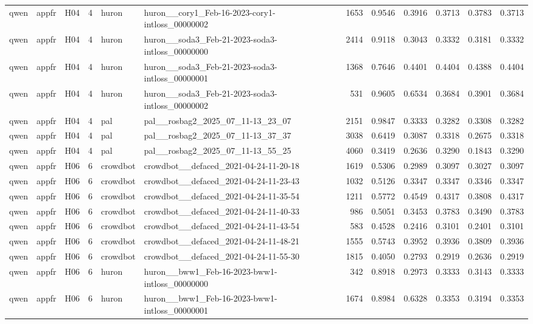 \begin{table}[tbp]
\begin{tabular}{lllrllrrrrrr}
qwen & appfr & H04 & 4 & huron & huron\_\_cory1\_Feb-16-2023-cory1-intloss\_00000002 & 1653 & 0.9546 & 0.3916 & 0.3713 & 0.3783 & 0.3713 \\
qwen & appfr & H04 & 4 & huron & huron\_\_soda3\_Feb-21-2023-soda3-intloss\_00000000 & 2414 & 0.9118 & 0.3043 & 0.3332 & 0.3181 & 0.3332 \\
qwen & appfr & H04 & 4 & huron & huron\_\_soda3\_Feb-21-2023-soda3-intloss\_00000001 & 1368 & 0.7646 & 0.4401 & 0.4404 & 0.4388 & 0.4404 \\
qwen & appfr & H04 & 4 & huron & huron\_\_soda3\_Feb-21-2023-soda3-intloss\_00000002 & 531 & 0.9605 & 0.6534 & 0.3684 & 0.3901 & 0.3684 \\
qwen & appfr & H04 & 4 & pal & pal\_\_rosbag2\_2025\_07\_11-13\_23\_07 & 2151 & 0.9847 & 0.3333 & 0.3282 & 0.3308 & 0.3282 \\
qwen & appfr & H04 & 4 & pal & pal\_\_rosbag2\_2025\_07\_11-13\_37\_37 & 3038 & 0.6419 & 0.3087 & 0.3318 & 0.2675 & 0.3318 \\
qwen & appfr & H04 & 4 & pal & pal\_\_rosbag2\_2025\_07\_11-13\_55\_25 & 4060 & 0.3419 & 0.2636 & 0.3290 & 0.1843 & 0.3290 \\
qwen & appfr & H06 & 6 & crowdbot & crowdbot\_\_defaced\_2021-04-24-11-20-18 & 1619 & 0.5306 & 0.2989 & 0.3097 & 0.3027 & 0.3097 \\
qwen & appfr & H06 & 6 & crowdbot & crowdbot\_\_defaced\_2021-04-24-11-23-43 & 1032 & 0.5126 & 0.3347 & 0.3347 & 0.3346 & 0.3347 \\
qwen & appfr & H06 & 6 & crowdbot & crowdbot\_\_defaced\_2021-04-24-11-35-54 & 1211 & 0.5772 & 0.4549 & 0.4317 & 0.3808 & 0.4317 \\
qwen & appfr & H06 & 6 & crowdbot & crowdbot\_\_defaced\_2021-04-24-11-40-33 & 986 & 0.5051 & 0.3453 & 0.3783 & 0.3490 & 0.3783 \\
qwen & appfr & H06 & 6 & crowdbot & crowdbot\_\_defaced\_2021-04-24-11-43-54 & 583 & 0.4528 & 0.2416 & 0.3101 & 0.2401 & 0.3101 \\
qwen & appfr & H06 & 6 & crowdbot & crowdbot\_\_defaced\_2021-04-24-11-48-21 & 1555 & 0.5743 & 0.3952 & 0.3936 & 0.3809 & 0.3936 \\
qwen & appfr & H06 & 6 & crowdbot & crowdbot\_\_defaced\_2021-04-24-11-55-30 & 1815 & 0.4050 & 0.2793 & 0.2919 & 0.2636 & 0.2919 \\
qwen & appfr & H06 & 6 & huron & huron\_\_bww1\_Feb-16-2023-bww1-intloss\_00000000 & 342 & 0.8918 & 0.2973 & 0.3333 & 0.3143 & 0.3333 \\
qwen & appfr & H06 & 6 & huron & huron\_\_bww1\_Feb-16-2023-bww1-intloss\_00000001 & 1674 & 0.8984 & 0.6328 & 0.3353 & 0.3194 & 0.3353 \\

\end{tabular}
\end{table}
